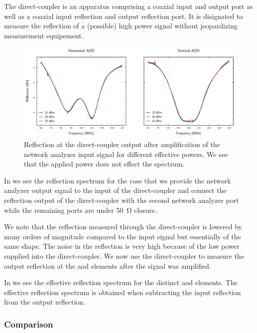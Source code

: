 The direct-coupler is an apparatus comprising a coaxial input and output
port as well as a coaxial input reflection and output reflection port. It is
disignated to measure the reflection of a (possible) high power signal
without jeopardizing measurement equipement.
\begin{figure}[htb]
  \centering
  \includegraphics[width=\textwidth]{../figure/signal/reflection/coupled.pdf}
  \caption{Reflection at the direct-coupler output after amplification of the
  network analyzer input signal for different effective powers. We see that
the applied power does not effect the spectrum.
}\label{fig:signal_reflection_coupled}
\end{figure}
In  we see the reflection spectrum for
the case that we provide the network analyzer output signal to the input of
the direct-coupler and connect the reflection output of the direct-coupler
with the second network analyzer port while the remaining ports are under
\SI{50}{\ohm} closure.

We note that the reflection measured through the direct-coupler is lowered
by many orders of magnitude compared to the input signal but essentially of
the same shape. The noise in the reflection is very high because of the low
power supplied into the direct-coupler. We now use the direct-coupler to
measure the output reflection at the
\gls{aod} elements after the signal was amplified.

In  we see the effective reflection
spectrum for the distinct \gls{aod} elements. The effective reflection
spectrum is obtained when subtracting the input reflection from the output
reflection.

\subsubsection{Comparison}

